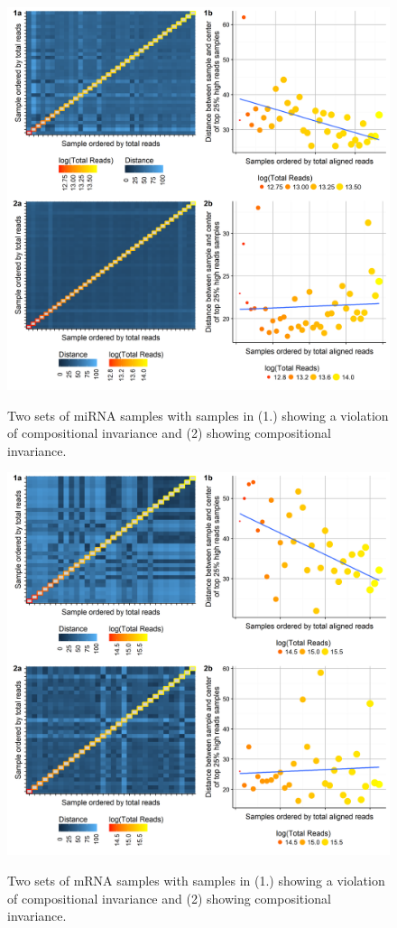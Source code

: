\documentclass{article}\usepackage[]{graphicx}\usepackage[]{color}
\theoremstyle{definition}
\begin{document}
\begin{figure}
\centering
\includegraphics[scale=0.6]{./Figures/CompInvPlots_miRNA}
\label{miComp}
\caption{Two sets of miRNA samples with samples in (1.) showing a violation of compositional invariance and (2) showing compositional invariance.}
\end{figure}


\begin{figure}
\centering
\includegraphics[scale=0.6]{./Figures/CompInvPlots_Celgene}
\label{celComp}
\caption{Two sets of mRNA samples with samples in (1.) showing a violation of compositional invariance and (2) showing compositional invariance.}
\end{figure}
\end{document}
